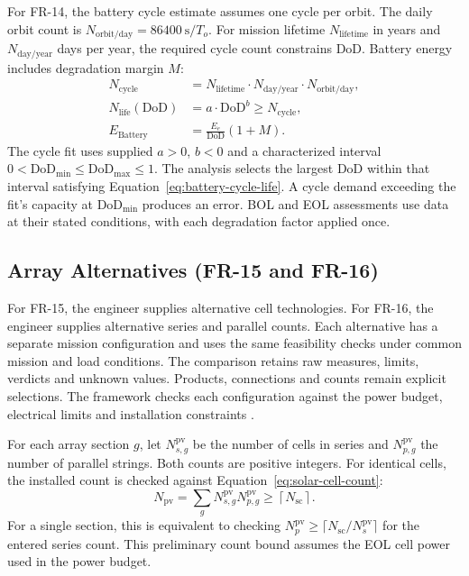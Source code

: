 For FR-14, the battery cycle estimate assumes one cycle per orbit. The daily orbit count is $N_{\mathrm{orbit/day}}=86400~\mathrm{s}/T_o$. For mission lifetime $N_{\mathrm{lifetime}}$ in years and $N_{\mathrm{day/year}}$ days per year, the required cycle count constrains $\mathrm{DoD}$. Battery energy includes degradation margin $M$:
\begin{align}
    N_{\mathrm{cycle}} &= N_{\mathrm{lifetime}}\cdot N_{\mathrm{day/year}}\cdot N_{\mathrm{orbit/day}},
    \label{eq:battery-mission-cycles} \\
    N_{\mathrm{life}}(\mathrm{DoD}) &= a\cdot \mathrm{DoD}^{b}\geq N_{\mathrm{cycle}},
    \label{eq:battery-cycle-life} \\
    E_{\mathrm{Battery}} &= \frac{E_e}{\mathrm{DoD}}(1+M).
    \label{eq:battery-energy}
\end{align}
The cycle fit uses supplied $a>0$, $b<0$ and a characterized interval $0<\mathrm{DoD}_{\min}\leq\mathrm{DoD}_{\max}\leq1$. The analysis selects the largest DoD within that interval satisfying Equation~\eqref{eq:battery-cycle-life}. A cycle demand exceeding the fit's capacity at $\mathrm{DoD}_{\min}$ produces an error. BOL and EOL assessments use data at their stated conditions, with each degradation factor applied once.

\subsection{Array Alternatives (FR-15 and FR-16)}
For FR-15, the engineer supplies alternative cell technologies. For FR-16, the engineer supplies alternative series and parallel counts. Each alternative has a separate mission configuration and uses the same feasibility checks under common mission and load conditions. The comparison retains raw measures, limits, verdicts and unknown values. Products, connections and counts remain explicit selections. The framework checks each configuration against the power budget, electrical limits and installation constraints \citep[Sec.~3]{review-0289}.

For each array section $g$, let $N_{s,g}^{\mathrm{pv}}$ be the number of cells in series and $N_{p,g}^{\mathrm{pv}}$ the number of parallel strings. Both counts are positive integers. For identical cells, the installed count is checked against Equation~\eqref{eq:solar-cell-count}:
\begin{equation}
    N_{\mathrm{pv}}=\sum_g N_{s,g}^{\mathrm{pv}}N_{p,g}^{\mathrm{pv}}
    \geq\left\lceil N_{\mathrm{sc}}\right\rceil.
    \label{eq:pv-integer-configuration}
\end{equation}
For a single section, this is equivalent to checking $N_p^{\mathrm{pv}}\geq\lceil N_{\mathrm{sc}}/N_s^{\mathrm{pv}}\rceil$ for the entered series count. This preliminary count bound assumes the EOL cell power used in the power budget.

